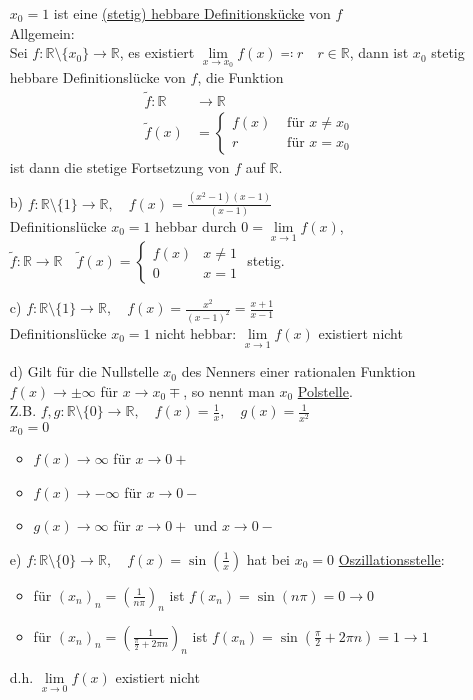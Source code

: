 \documentclass[12pt, titlepage]{article}
\newcommand{\R}{\mathds{R}}
\renewcommand{\*}{\cdot}
\begin{document}
\begin{itemize}
		$x_0=1$ ist eine \underline{(stetig) hebbare Definitionskücke} von $f$\\
		Allgemein:\\
		Sei $f\colon\R\setminus\{x_0\}\rightarrow\R$, es existiert $\lim\limits_{x\rightarrow x_0}f(x)\eqqcolon r\quad r\in\R$, dann ist $x_0$ stetig hebbare Definitionslücke von $f$, die Funktion
		\begin{align*}
			\tilde{f}\colon \R&\rightarrow\R\\
			\tilde{f}(x)&=\begin{cases}f(x)&\textrm{ für }x\neq x_0\\
			r&\textrm{ für }x=x_0
			\end{cases}
		\end{align*}
		ist dann die stetige Fortsetzung von $f$ auf $\R$.
		\item[b)] $f\colon\R\setminus\{1\}\rightarrow\R,\quad f(x)=\frac{(x^2-1)(x-1)}{(x-1)}$\\
		Definitionslücke $x_0=1$ hebbar durch $0=\lim\limits_{x\rightarrow1}f(x)$,\\
		$\tilde{f}\colon\R\rightarrow\R\quad\tilde{f}(x)=\begin{cases}f(x)&x\neq 1\\0&x=1
		\end{cases}$ stetig.
		\item[c)] $f\colon\R\setminus\{1\}\rightarrow\R,\quad f(x)=\frac{x^2}{(x-1)^2}=\frac{x+1}{x-1}$\\
		Definitionslücke $x_0=1$ nicht hebbar: $\lim\limits_{x\rightarrow1}f(x)$ existiert nicht
		\item[d)] Gilt für die Nullstelle $x_0$ des Nenners einer rationalen Funktion $f(x)\rightarrow\pm\infty$ für $x\rightarrow x_0\mp$, so nennt man $x_0$ \underline{Polstelle}.\\
		Z.B. $f,g\colon\R\setminus\{0\}\rightarrow\R,\quad f(x)=\frac{1}{x},\quad g(x)=\frac{1}{x^2}$\\
		$x_0=0$\\
		\begin{itemize}
			\item $f(x)\rightarrow\infty$ für $x\rightarrow0+$
			\item $f(x)\rightarrow-\infty$ für $x\rightarrow0-$
			\item $g(x)\rightarrow\infty$ für $x\rightarrow0+$ und $x\rightarrow0-$
		\end{itemize}
		\item[e)] $f\colon\R\setminus\{0\}\rightarrow\R,\quad f(x)=\sin(\frac{1}{x})$ hat bei $x_0=0$ \underline{Oszillationsstelle}:
		\begin{itemize}
			\item für $(x_n)_n=(\frac{1}{n\pi})_n$ ist $f(x_n)=\sin(n\pi)=0\rightarrow0$
			\item für $(x_n)_n=(\frac{1}{\frac{\pi}{2}+2\pi n})_n$ ist $f(x_n)=\sin(\frac{\pi}{2}+2\pi n)=1\rightarrow1$
		\end{itemize}
		d.h. $\lim\limits_{x\rightarrow0}f(x)$ existiert nicht
	\end{itemize}
	
	
	
	
	
	
	
\end{document}
